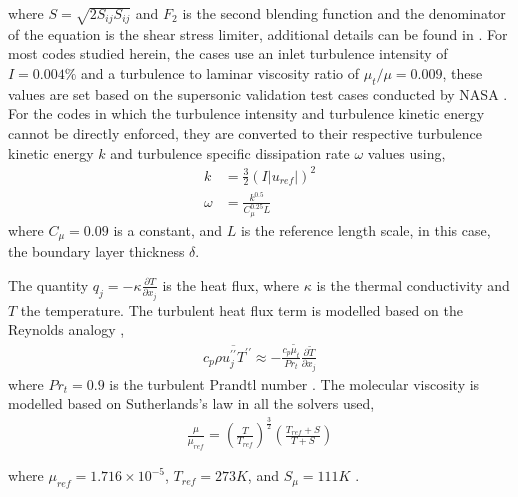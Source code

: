 \documentclass[journal ]{new-aiaa}
\begin{document}
where $S = \sqrt{2 S_{ij} S_{ij}}$ and $F_2$ is the second blending function and the denominator of the equation is the shear stress limiter, additional details can be found in \cite{wilcox2006turbulence}. For most codes studied herein, the cases use an inlet turbulence intensity of $I = 0.004\%$ and a turbulence to laminar viscosity ratio of $\mu_{t}/\mu = 0.009$, these values are set based on the supersonic validation test cases conducted by NASA \cite{Menter1994SST}. For the codes in which the turbulence intensity and turbulence kinetic energy cannot be directly enforced, they are converted to their respective turbulence kinetic energy $k$ and turbulence specific dissipation rate $\omega$ values using,
\begin{align}
    k &= \frac{3}{2} \left( I |u_{ref}| \right)^2  \\
    \omega &= \frac{k^{0.5}}{C_{\mu}^{0.25} L}
\end{align}
where $C_{\mu} = 0.09$ is a constant, and $L$ is the reference length scale, in this case, the boundary layer thickness $\delta$. 

The quantity $q_j = - \kappa \frac{\partial T}{\partial x_j}$ is the heat flux, where $\kappa$ is the thermal conductivity and $T$ the temperature. The turbulent heat flux term is modelled based on the Reynolds analogy \cite{Rumsey2016NASA},
\begin{align}
    c_p \overline{\rho u_j^{\prime\prime} T^{\prime\prime}} \approx - \frac{c_p \tilde{\mu_t}}{Pr_t} \frac{\partial \tilde{T}}{\partial x_j} 
\end{align}
where $Pr_t = 0.9$ is the turbulent Prandtl number \cite{Zhang2018DNS}. The molecular viscosity is modelled based on Sutherlands’s law in all the solvers used,
\begin{align}
    \frac{\mu}{\mu_{ref}} = \left(\frac{T}{T_{ref}} \right)^{\frac{3}{2}} \left(\frac{T_{ref} + S}{T + S} \right)
    \label{eq:Ias}
\end{align}

where $\mu_{ref} = 1.716 \times 10^{-5}$, $T_{ref} = 273 K$, and $S_{\mu} = 111K$ \cite{White2006}. 

\end{document}
